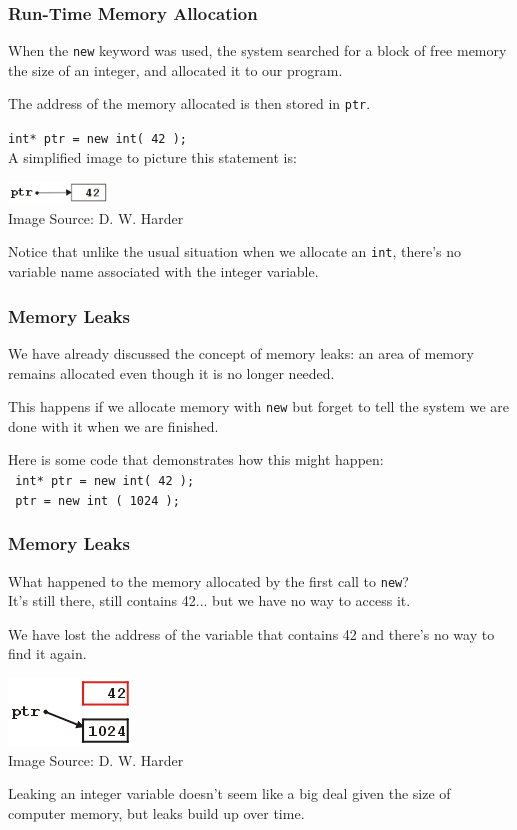 \begin{frame}
\frametitle{Run-Time Memory Allocation}

When the \texttt{new} keyword was used, the system searched for a block of free memory the size of an integer, and allocated it to our program.

The address of the memory allocated is then stored in \texttt{ptr}.

\texttt{int* ptr = new int( 42 );}\\
A simplified image to picture this statement is:

\begin{center}
\includegraphics[width=0.2\textwidth]{images/new02.png}\\
{\tiny Image Source: D. W. Harder}
\end{center}

Notice that unlike the usual situation when we allocate an \texttt{int}, there's no variable name associated with the integer variable.

\end{frame}


\begin{frame}
\frametitle{Memory Leaks}

We have already discussed the concept of memory leaks: an area of memory remains allocated even though it is no longer needed.

This happens if we allocate memory with \texttt{new} but forget to tell the system we are done with it when we are finished.

Here is some code that demonstrates how this might happen:\\
\texttt{
\quad int* ptr = new int( 42 );\\
\quad ~ptr = new int ( 1024 );
}

\end{frame}


\begin{frame}
\frametitle{Memory Leaks}
What happened to the memory allocated by the first call to \texttt{new}?\\
\quad It's still there, still contains 42... but we have no way to access it.

We have lost the address of the variable that contains 42 and there's no way to find it again.

\begin{center}
\includegraphics{images/new05.png}\\
{\tiny Image Source: D. W. Harder}
\end{center}

Leaking an integer variable doesn't seem like a big deal given the size of computer memory, but leaks build up over time.

\end{frame}


